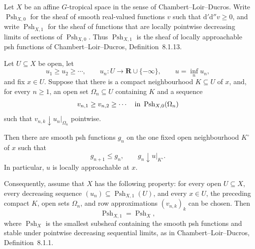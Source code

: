
Let \(X\) be an affine \(G\)-tropical space in the sense of
Chambert--Loir--Ducros.  Write \(\operatorname{Psh}_{X,0}\) for the sheaf of
smooth real-valued functions \(v\) such that
\(\mathrm d'\mathrm d''v\geq0\), and write
\(\operatorname{Psh}_{X,1}\) for the sheaf of functions that are locally
pointwise decreasing limits of sections of
\(\operatorname{Psh}_{X,0}\).  Thus
\(\operatorname{Psh}_{X,1}\) is the sheaf of locally approachable psh
functions of Chambert--Loir--Ducros, Definition~8.1.13.

Let \(U\subseteq X\) be open, let
\[
 u_1\geq u_2\geq\cdots,\qquad
 u_n:U\longrightarrow\mathbf R\cup\{-\infty\},\qquad
 u=\inf_n u_n,
\]
and fix \(x\in U\).  Suppose that there is a compact neighbourhood
\(K\subseteq U\) of \(x\), and, for every \(n\geq1\), an open set
\(\Omega_n\subseteq U\) containing \(K\) and a sequence
\[
 v_{n,1}\geq v_{n,2}\geq\cdots
       \quad\hbox{in }\operatorname{Psh}_{X,0}(\Omega_n)
\]
such that \(v_{n,k}\downarrow u_n|_{\Omega_n}\) pointwise.

Then there are smooth psh functions \(g_n\) on the one fixed open
neighbourhood \(K^\circ\) of \(x\) such that
\[
                     g_{n+1}\leq g_n,\qquad g_n\downarrow u|_{K^\circ}.
                     \tag{1}
\]
In particular, \(u\) is locally approachable at \(x\).

Consequently, assume that \(X\) has the following property: for every open
\(U\subseteq X\), every decreasing sequence
\((u_n)\subseteq\operatorname{Psh}_{X,1}(U)\), and every \(x\in U\), the
preceding compact \(K\), open sets \(\Omega_n\), and row approximations
\((v_{n,k})_k\) can be chosen.  Then
\[
                    \operatorname{Psh}_{X,1}=\operatorname{Psh}_X,
                    \tag{2}
\]
where \(\operatorname{Psh}_X\) is the smallest subsheaf containing the
smooth psh functions and stable under pointwise decreasing sequential
limits, as in Chambert--Loir--Ducros, Definition~8.1.1.

